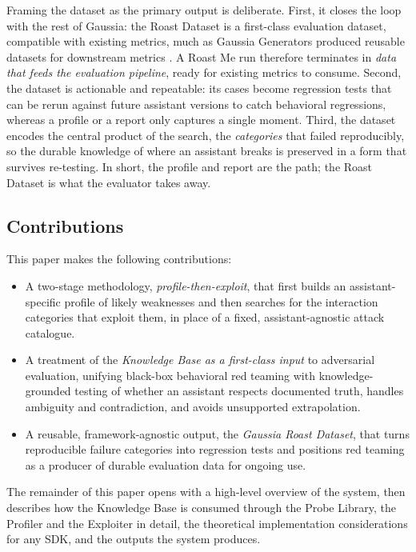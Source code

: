 \documentclass[11pt,a4paper]{article}
\begin{document}
Framing the dataset as the primary output is deliberate. First, it closes the
loop with the rest of Gaussia: the Roast Dataset is a first-class evaluation
dataset, compatible with existing metrics, much as Gaussia Generators produced
reusable datasets for downstream metrics \citep{gaussia-generators}. A Roast Me
run therefore terminates in \emph{data that feeds the evaluation pipeline},
ready for existing metrics to consume. Second, the dataset is actionable and
repeatable: its cases become regression tests that can be rerun against future
assistant versions to catch behavioral regressions, whereas a profile or a
report only captures a single moment. Third, the dataset encodes the central
product of the search, the \emph{categories} that failed reproducibly, so the
durable knowledge of where an assistant breaks is preserved in a form that
survives re-testing. In short, the profile and report are the path; the Roast
Dataset is what the evaluator takes away.

\subsection{Contributions}

This paper makes the following contributions:

\begin{itemize}
  \item A two-stage methodology, \emph{profile-then-exploit}, that first builds an
  assistant-specific profile of likely weaknesses and then searches for the
  interaction categories that exploit them, in place of a fixed,
  assistant-agnostic attack catalogue.
  \item A treatment of the \emph{Knowledge Base as a first-class input} to
  adversarial evaluation, unifying black-box behavioral red teaming with
  knowledge-grounded testing of whether an assistant respects documented truth,
  handles ambiguity and contradiction, and avoids unsupported extrapolation.
  \item A reusable, framework-agnostic output, the \emph{Gaussia Roast Dataset},
  that turns reproducible failure categories into regression tests and positions
  red teaming as a producer of durable evaluation data for ongoing use.
\end{itemize}

The remainder of this paper opens with a high-level overview of the system, then
describes how the Knowledge Base is consumed through the Probe Library, the
Profiler and the Exploiter in detail, the theoretical implementation
considerations for any SDK, and the outputs the system produces.
\end{document}
